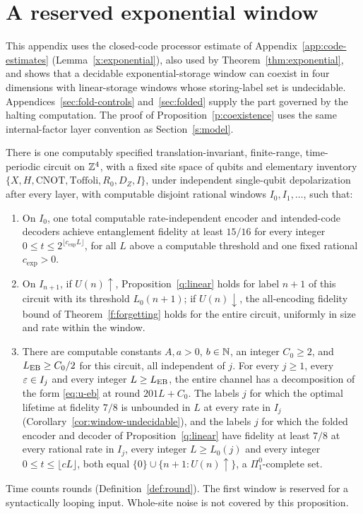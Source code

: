 \section{A reserved exponential window}\label{sec:coexistence}

This appendix uses the closed-code processor estimate of Appendix~\ref{app:code-estimates} (Lemma~\ref{x:exponential}), also used by Theorem~\ref{thm:exponential}, and shows that a decidable exponential-storage window can coexist in four dimensions with linear-storage windows whose storing-label set is undecidable.
Appendices~\ref{sec:fold-controls} and~\ref{sec:folded} supply the part governed by the halting computation.
The proof of Proposition~\ref{p:coexistence} uses the same internal-factor layer convention as
Section~\ref{s:model}.

\begin{proposition}\label{p:coexistence}
There is one computably specified translation-invariant, finite-range,
time-periodic circuit on \(\mathbb Z^4\), with a fixed site space of qubits
and elementary inventory
\(\{X,H,\mathrm{CNOT},\mathrm{Toffoli},R_0,D_Z,I\}\), under independent
single-qubit depolarization after every layer, with computable disjoint
rational windows \(I_0,I_1,\ldots\), such that:
\begin{enumerate}
\item On \(I_0\), one total computable rate-independent encoder and
intended-code decoders achieve entanglement fidelity at least \(15/16\)
for every integer \(0\le t\le2^{\lfloor c_{\exp}L\rfloor}\), for all
\(L\) above a computable threshold and one fixed rational \(c_{\exp}>0\).
\item On \(I_{n+1}\), if \(U(n)\uparrow\), Proposition~\ref{q:linear}
holds for label \(n+1\) of this circuit with its threshold
\(L_0(n+1)\); if \(U(n)\downarrow\), the all-encoding fidelity bound of
Theorem~\ref{f:forgetting} holds for the entire circuit, uniformly in
size and rate within the window.
\item There are computable constants \(A,a>0\), \(b\in\mathbb N\), an
integer \(C_0\ge2\), and \(L_{\rm EB}\ge C_0/2\) for this circuit,
all independent of \(j\). For every \(j\ge1\), every \(\varepsilon\in I_j\)
and every integer \(L\ge L_{\rm EB}\), the entire channel has a
decomposition of the form \eqref{eq:u-eb} at round \(201L+C_0\).
The labels \(j\) for which
the optimal lifetime at fidelity \(7/8\) is unbounded in \(L\) at
every rate in \(I_j\) (Corollary~\ref{cor:window-undecidable}),
and the labels \(j\) for which the folded encoder and decoder of
Proposition~\ref{q:linear} have fidelity at least \(7/8\) at every
rational rate in \(I_j\), every integer \(L\ge L_0(j)\) and every
integer \(0\le t\le\lfloor cL\rfloor\), both equal
\(\{0\}\cup\{n+1:U(n)\uparrow\}\), a \(\Pi^0_1\)-complete set.
\end{enumerate}
Time counts rounds (Definition~\ref{def:round}). The first window is
reserved for a syntactically looping input.
Whole-site noise is not covered by this proposition.
\end{proposition}


